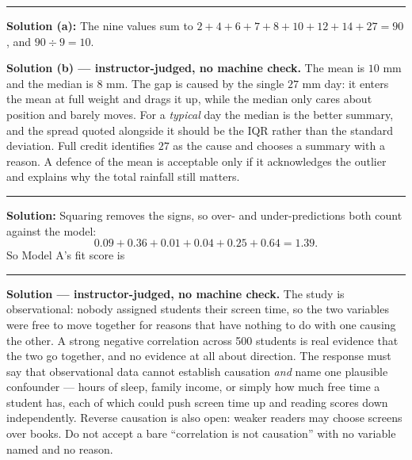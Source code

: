 \documentclass[12pt]{article}
\begin{document}
\vspace{0.15cm}\noindent\rule{\linewidth}{0.2pt}\vspace{0.15cm}


\textbf{Solution (a):} The nine values sum to
$2+4+6+7+8+10+12+14+27 = 90$, and $90 \div 9 = 10$. 

\textbf{Solution (b) --- instructor-judged, no machine check.} The mean is
$10$ mm and the median is $8$ mm. The gap is caused by the single $27$ mm day:
it enters the mean at full weight and drags it up, while the median only cares
about position and barely moves. For a \emph{typical} day the median is the
better summary, and the spread quoted alongside it should be the IQR rather than
the standard deviation. Full credit identifies $27$ as the cause and chooses a
summary with a reason. A defence of the mean is acceptable only if it
acknowledges the outlier and explains why the total rainfall still matters.

\vspace{0.15cm}\noindent\rule{\linewidth}{0.2pt}\vspace{0.15cm}


\textbf{Solution:} Squaring removes the signs, so over- and under-predictions
both count against the model:
\[
  0.09 + 0.36 + 0.01 + 0.04 + 0.25 + 0.64 = 1.39 .
\]
So Model A's fit score is 

\vspace{0.15cm}\noindent\rule{\linewidth}{0.2pt}\vspace{0.15cm}


\textbf{Solution --- instructor-judged, no machine check.} The study is
observational: nobody assigned students their screen time, so the two variables
were free to move together for reasons that have nothing to do with one causing
the other. A strong negative correlation across 500 students is real evidence
that the two go together, and no evidence at all about direction. The response
must say that observational data cannot establish causation \emph{and} name one
plausible confounder --- hours of sleep, family income, or simply how much free
time a student has, each of which could push screen time up and reading scores
down independently. Reverse causation is also open: weaker readers may choose
screens over books. Do not accept a bare ``correlation is not causation'' with no
variable named and no reason.
\end{document}

